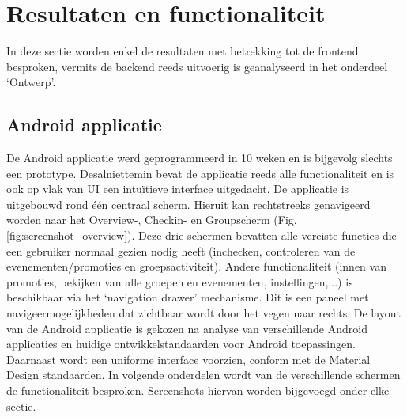 
\chapter{Resultaten en functionaliteit}
In deze sectie worden enkel de resultaten met betrekking tot de frontend besproken, vermits de backend reeds uitvoerig is geanalyseerd in het onderdeel `Ontwerp'.
\section{Android applicatie}
De Android applicatie werd geprogrammeerd in 10 weken en is bijgevolg slechts een prototype. Desalniettemin bevat de applicatie reeds alle functionaliteit en is ook op vlak van UI een intuïtieve interface uitgedacht.
De applicatie is uitgebouwd rond één centraal scherm. Hieruit kan rechtstreeks genavigeerd worden naar het Overview-, Checkin- en Groupscherm (Fig. \ref{fig:screenshot_overview}). Deze drie schermen bevatten alle vereiste functies die een gebruiker normaal gezien nodig heeft (inchecken, controleren van de evenementen/promoties en groepsactiviteit). Andere functionaliteit (innen van promoties, bekijken van alle groepen en evenementen, instellingen,...) is beschikbaar via het `navigation drawer' mechanisme. Dit is een paneel met navigeermogelijkheden dat zichtbaar wordt door het vegen naar rechts. De layout van de Android applicatie is gekozen na analyse van verschillende Android applicaties en huidige ontwikkelstandaarden voor Android toepassingen. Daarnaast wordt een uniforme interface voorzien, conform met de Material Design standaarden. In volgende onderdelen wordt van de verschillende schermen de functionaliteit besproken. Screenshots hiervan worden bijgevoegd onder elke sectie.
